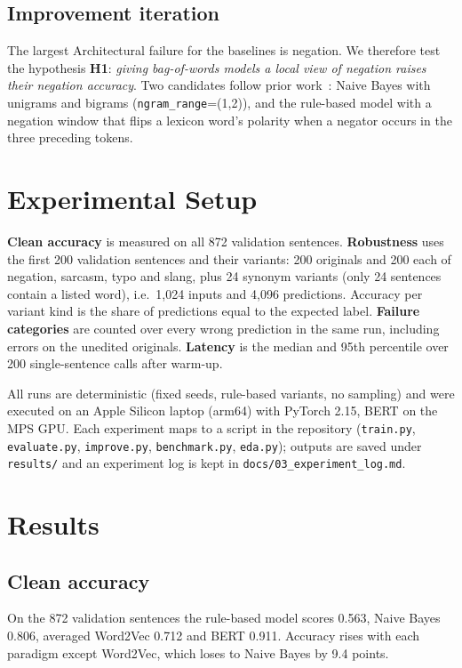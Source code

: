 \documentclass[conference]{IEEEtran}
\begin{document}
\subsection{Improvement iteration}\label{sec:improve-method}
The largest Architectural failure for the baselines is negation. We therefore test the hypothesis
\textbf{H1}: \emph{giving bag-of-words models a local view of negation raises their negation
accuracy}. Two candidates follow prior work~\cite{pang2002,wang2012}: Naive Bayes with unigrams and
bigrams (\texttt{ngram\_range}=(1,2)), and the rule-based model with a negation window that flips a
lexicon word's polarity when a negator occurs in the three preceding tokens.

\section{Experimental Setup}\label{sec:setup}
\textbf{Clean accuracy} is measured on all 872 validation sentences. \textbf{Robustness} uses the
first 200 validation sentences and their variants: 200 originals and 200 each of negation, sarcasm,
typo and slang, plus 24 synonym variants (only 24 sentences contain a listed word), i.e.\ 1{,}024
inputs and 4{,}096 predictions. Accuracy per variant kind is the share of predictions equal to the
expected label. \textbf{Failure categories} are counted over every wrong prediction in the same run,
including errors on the unedited originals. \textbf{Latency} is the median and 95th percentile over
200 single-sentence calls after warm-up.

All runs are deterministic (fixed seeds, rule-based variants, no sampling) and were executed on an
Apple Silicon laptop (arm64) with PyTorch 2.15, BERT on the MPS GPU. Each experiment maps to a
script in the repository (\texttt{train.py}, \texttt{evaluate.py}, \texttt{improve.py},
\texttt{benchmark.py}, \texttt{eda.py}); outputs are saved under \texttt{results/} and an
experiment log is kept in \texttt{docs/03\_experiment\_log.md}.

\section{Results}\label{sec:results}

\subsection{Clean accuracy}
On the 872 validation sentences the rule-based model scores 0.563, Naive Bayes 0.806, averaged
Word2Vec 0.712 and BERT 0.911. Accuracy rises with each paradigm except Word2Vec, which loses to
Naive Bayes by 9.4 points.
\end{document}
